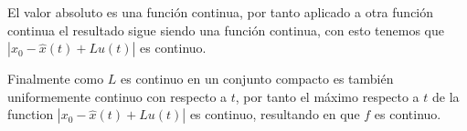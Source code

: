 El valor absoluto es una función continua, por tanto aplicado a otra función continua el resultado sigue siendo una función continua,
con esto tenemos que $| x_0 - \hat{x}(t) + Lu(t) |$ es continuo.

Finalmente como $L$ es continuo en un conjunto compacto es también uniformemente continuo con respecto a $t$,
por tanto el máximo respecto a $t$ de la function $| x_0 - \hat{x}(t) + Lu(t) |$ es continuo,
resultando en que $f$ es continuo.


